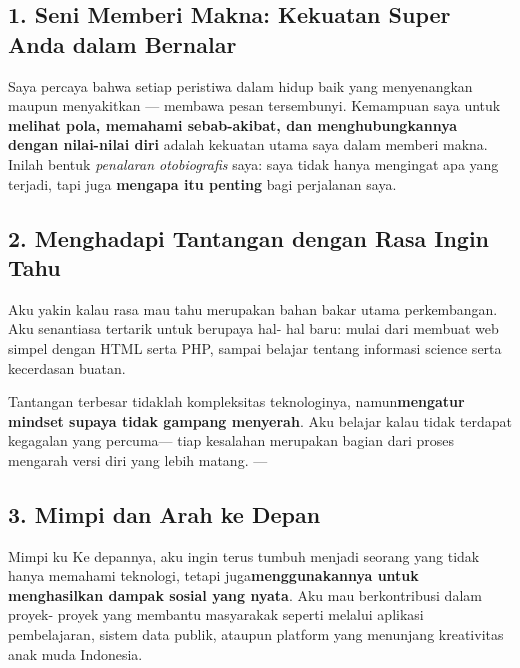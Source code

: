 \documentclass[
  letterpaper,
  DIV=11,
  numbers=noendperiod]{scrreprt}
\begin{document}
\subsection{\texorpdfstring{\textbf{1. Seni Memberi Makna: Kekuatan
Super Anda dalam
Bernalar}}{1. Seni Memberi Makna: Kekuatan Super Anda dalam Bernalar}}\label{seni-memberi-makna-kekuatan-super-anda-dalam-bernalar}

Saya percaya bahwa setiap peristiwa dalam hidup baik yang menyenangkan
maupun menyakitkan --- membawa pesan tersembunyi. Kemampuan saya untuk
\textbf{melihat pola, memahami sebab-akibat, dan menghubungkannya dengan
nilai-nilai diri} adalah kekuatan utama saya dalam memberi makna. Inilah
bentuk \emph{penalaran otobiografis} saya: saya tidak hanya mengingat
apa yang terjadi, tapi juga \textbf{mengapa itu penting} bagi perjalanan
saya.

\subsection{\texorpdfstring{\textbf{2. Menghadapi Tantangan dengan Rasa
Ingin
Tahu}}{2. Menghadapi Tantangan dengan Rasa Ingin Tahu}}\label{menghadapi-tantangan-dengan-rasa-ingin-tahu}

Aku yakin kalau rasa mau tahu merupakan bahan bakar utama perkembangan.
Aku senantiasa tertarik untuk berupaya hal- hal baru: mulai dari membuat
web simpel dengan HTML serta PHP, sampai belajar tentang informasi
science serta kecerdasan buatan.

Tantangan terbesar tidaklah kompleksitas teknologinya,
namun\textbf{mengatur mindset supaya tidak gampang menyerah}. Aku
belajar kalau tidak terdapat kegagalan yang percuma--- tiap kesalahan
merupakan bagian dari proses mengarah versi diri yang lebih matang. ---

\subsection{\texorpdfstring{\textbf{3. Mimpi dan Arah ke
Depan}}{3. Mimpi dan Arah ke Depan}}\label{mimpi-dan-arah-ke-depan}

Mimpi ku Ke depannya, aku ingin terus tumbuh menjadi seorang yang tidak
hanya memahami teknologi, tetapi juga\textbf{menggunakannya untuk
menghasilkan dampak sosial yang nyata}. Aku mau berkontribusi dalam
proyek- proyek yang membantu masyarakak seperti melalui aplikasi
pembelajaran, sistem data publik, ataupun platform yang menunjang
kreativitas anak muda Indonesia.
\end{document}
